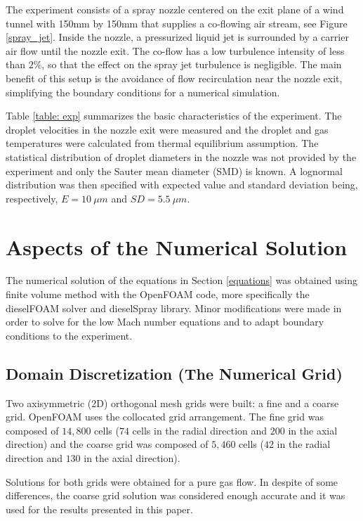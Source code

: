 \documentclass[preprint,12pt,review]{elsarticle}
\begin{document}
The experiment consists of a spray nozzle centered on the exit plane of a wind tunnel with 150mm by 150mm that supplies a co-flowing air stream, see Figure \ref{spray_jet}. 
Inside the nozzle, a pressurized liquid jet is surrounded by a carrier air flow until the nozzle exit. The co-flow has a low turbulence intensity of less than $2\%$, so that the effect on the spray jet turbulence is negligible. The main benefit of this setup is the avoidance of flow recirculation near the nozzle exit, simplifying the boundary conditions for a numerical simulation.

Table \ref{table: exp} summarizes the basic characteristics of the experiment. The droplet velocities in the nozzle exit were measured and the droplet and gas temperatures were calculated from thermal equilibrium assumption. The statistical distribution of droplet diameters in the nozzle was not provided by the experiment and only the Sauter mean diameter (SMD) is known.  A lognormal distribution was then specified with expected value and standard deviation being, respectively, $E = 10\ \mu m$ and $SD=5.5\ \mu m$.

\section{Aspects of the Numerical Solution}
The numerical solution of the equations in Section \ref{equations} was obtained using finite volume method with the OpenFOAM code, more specifically the dieselFOAM solver and dieselSpray library. Minor modifications were made in order to solve for the low Mach number equations and to adapt boundary conditions to the experiment.

\subsection{Domain Discretization (The Numerical Grid)}

Two axisymmetric (2D) orthogonal mesh grids were built: a fine and a coarse grid. OpenFOAM uses the collocated grid arrangement. The fine grid was composed of $14,800$ cells ($74$ cells in the radial direction and $200$ in the axial direction) and the coarse grid was composed of $5,460$ cells ($42$ in the radial direction and $130$ in the axial direction).

Solutions for both grids were obtained for a pure gas flow. In despite of some differences, the coarse grid solution was considered enough accurate and it was used for the results presented in this paper.
\end{document}
